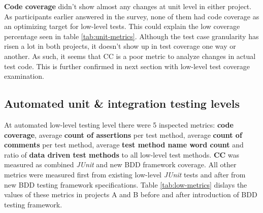 \textbf{Code coverage} didn't show almost any changes at unit level in either project. As participants earlier answered in the survey, none
of them had code coverage as an optimizing target for low-level tests. This could explain the low coverage percentage seen in
table \ref{tab:unit-metrics}. Although the test case granularity has risen a lot in both projects, it doesn't
show up in test coverage one way or another. As such, it seems that CC is a poor metric to analyze changes in actual test
code. This is further confirmed in next section with low-level test coverage examination.

\subsection{Automated unit \& integration testing levels}
\label{subsub:low-level-metrics}
At automated low-level testing level there were 5 inspected metrics: \textbf{code coverage}, average \textbf{count of assertions} per test method,
average \textbf{count of comments} per test method, average \textbf{test method name word count} and ratio of \textbf{data driven test methods} to
all low-level test methods. \textbf{CC} was measured as combined \textit{JUnit} and new BDD framework coverage. All other metrics
were measured first from existing low-level \textit{JUnit} tests and after from new BDD testing framework specifications.
Table \ref{tab:low-metrics} dislays the values of these metrics in projects A and B before and after introduction of BDD testing framework.


